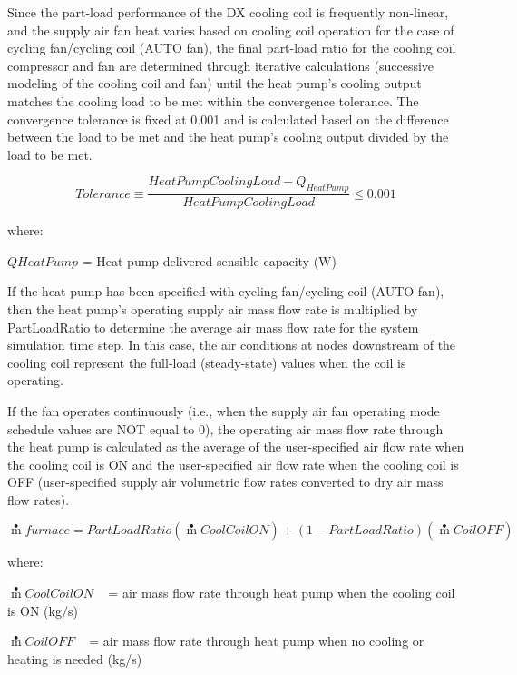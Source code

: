 Since the part-load performance of the DX cooling coil is frequently non-linear, and the supply air fan heat varies based on cooling coil operation for the case of cycling fan/cycling coil (AUTO fan), the final part-load ratio for the cooling coil compressor and fan are determined through iterative calculations (successive modeling of the cooling coil and fan) until the heat pump's cooling output matches the cooling load to be met within the convergence tolerance. The convergence tolerance is fixed at 0.001 and is calculated based on the difference between the load to be met and the heat pump's cooling output divided by the load to be met.

\begin{equation}
  Tolerance \equiv \frac{HeatPumpCoolingLoad - Q_{HeatPump}}{HeatPumpCoolingLoad} \leq 0.001
\end{equation}

where:

\(QHeatPump\) = Heat pump delivered sensible capacity (W)

If the heat pump has been specified with cycling fan/cycling coil (AUTO fan), then the heat pump's operating supply air mass flow rate is multiplied by PartLoadRatio to determine the average air mass flow rate for the system simulation time step. In this case, the air conditions at nodes downstream of the cooling coil represent the full-load (steady-state) values when the coil is operating.

If the fan operates continuously (i.e., when the supply air fan operating mode schedule values are NOT equal to 0), the operating air mass flow rate through the heat pump is calculated as the average of the user-specified air flow rate when the cooling coil is ON and the user-specified air flow rate when the cooling coil is OFF (user-specified supply air volumetric flow rates converted to dry air mass flow rates).

\begin{equation}
\mathop m\limits^ \bullet  furnace = PartLoadRatio\left( {\mathop m\limits^ \bullet  CoolCoilON} \right) + \left( {1 - PartLoadRatio} \right)\left( {\mathop m\limits^ \bullet  CoilOFF} \right)
\end{equation}

where:

\(\mathop m\limits^ \bullet CoolCoilON\) ~ = air mass flow rate through heat pump when the cooling coil is ON (kg/s)

\(\mathop m\limits^ \bullet CoilOFF\) ~ = air mass flow rate through heat pump when no cooling or heating is needed (kg/s)

